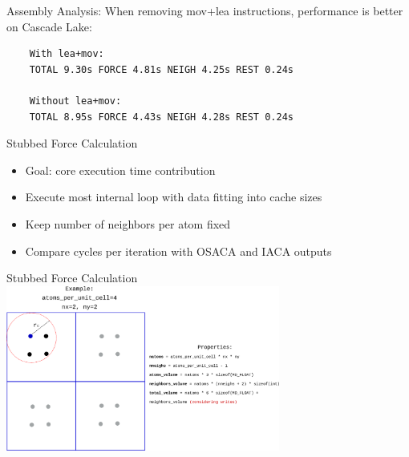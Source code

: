 \documentclass[aspectratio=169,t]{beamer}
\begin{document}
  \begin{frame}[fragile]{Assembly Analysis:}
    When removing mov+lea instructions, performance is better on Cascade Lake:
    \begin{verbatim}
    With lea+mov:
    TOTAL 9.30s FORCE 4.81s NEIGH 4.25s REST 0.24s

    Without lea+mov:
    TOTAL 8.95s FORCE 4.43s NEIGH 4.28s REST 0.24s
    \end{verbatim}
  \end{frame}

  \begin{frame}[fragile]{Stubbed Force Calculation}
    \begin{itemize}
      \item Goal: core execution time contribution
      \item Execute most internal loop with data fitting into cache sizes
      \item Keep number of neighbors per atom fixed
      \item Compare cycles per iteration with OSACA and IACA outputs
    \end{itemize}
  \end{frame}

  \begin{frame}{Stubbed Force Calculation}
  \centering
    \includegraphics[width=9cm]{stubbed_force_mdbench.png}
  \end{frame}
\end{document}
